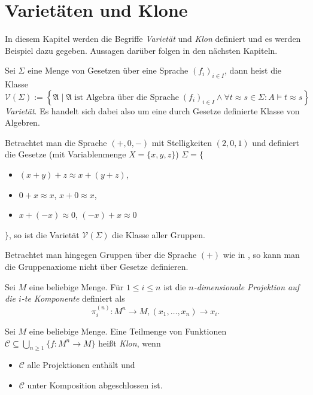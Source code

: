 \section{Varietäten und Klone}
In diesem Kapitel werden die Begriffe \emph{Varietät} und \emph{Klon} definiert und es werden Beispiel dazu gegeben. Aussagen darüber folgen in den nächsten Kapiteln.

\begin{definition}
    Sei $\Sigma$ eine Menge von Gesetzen über eine Sprache $(f_i)_{i \in I}$, dann heist die Klasse
    $$ \mathcal{V}(\Sigma) := \left\{ \mathfrak{A} \mid \mathfrak{A} \;\text{ist Algebra über die Sprache}\; (f_i)_{i \in I} \land \forall t \approx s \in \Sigma: A\models t\approx s \right\} $$
    \emph{Varietät}. Es handelt sich dabei also um eine durch Gesetze definierte Klasse von Algebren.
\end{definition}

\begin{example}
    Betrachtet man die Sprache $(+, 0, -)$ mit Stelligkeiten $(2, 0, 1)$ und definiert die Gesetze (mit Variablenmenge $X = \{x,y,z\}$) $\Sigma = \{$
    \begin{itemize}[label={}]
        \item $(x + y) + z \approx x + (y + z)$,
        \item $0 + x \approx x$, $x + 0 \approx x$,
        \item $x + (-x) \approx 0$, $(-x) + x \approx 0$
    \end{itemize}
    $\}$, so ist die Varietät $\mathcal{V}(\Sigma)$ die Klasse aller Gruppen.
    
    Betrachtet man hingegen Gruppen über die Sprache $(+)$ wie in , so kann man die Gruppenaxiome nicht über Gesetze definieren.
\end{example}

\begin{definition}
    Sei $M$ eine beliebige Menge. Für $1 \le i \le n$ ist die \emph{$n$-dimensionale Projektion auf die $i$-te Komponente} definiert als
    $$ \pi_i^{(n)}: M^n \to M, (x_1, \ldots, x_n) \to x_i. $$
\end{definition}

\begin{definition}
    Sei $M$ eine beliebige Menge. Eine Teilmenge von Funktionen $\mathcal{C} \subseteq \bigcup_{n \ge 1} \{f: M^n \to M\}$ heißt \emph{Klon}, wenn 
    \begin{itemize}[label={--}]
        \item $\mathcal{C}$ alle Projektionen enthält und
        \item $\mathcal{C}$ unter Komposition abgeschlossen ist.
    \end{itemize}
\end{definition}


